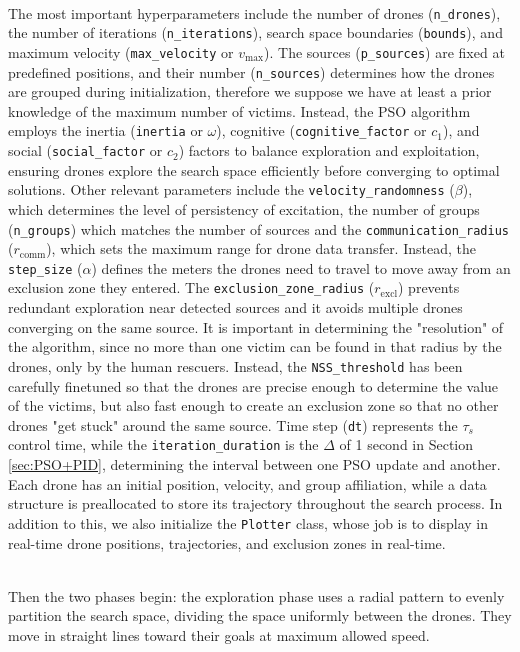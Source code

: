\documentclass[main]{subfiles}
\begin{document}
\noindent\\
The most important hyperparameters 
include the number of drones (\texttt{n\_drones}), 
the number of iterations (\texttt{n\_iterations}), 
search space boundaries (\texttt{bounds}), 
and maximum velocity (\texttt{max\_velocity} or $v_\text{max}$). 
The sources (\texttt{p\_sources}) are fixed at predefined positions, 
and their number (\texttt{n\_sources}) determines how the drones are grouped 
during initialization, therefore 
we suppose we have at least a prior knowledge 
of the maximum number of victims. Instead, the PSO algorithm employs 
the inertia (\texttt{inertia} or $\omega$), cognitive (\texttt{cognitive\_factor} or $c_1$), 
and social (\texttt{social\_factor} or $c_2$) factors to 
balance exploration and exploitation, 
ensuring drones explore the search space efficiently
before converging to optimal solutions.
Other relevant parameters include the \texttt{velocity\_randomness} ($\beta$), 
which determines the level of persistency of excitation, the number of groups 
(\texttt{n\_groups}) which matches the number of sources and
the \texttt{communication\_radius} ($r_\text{comm}$), which sets the maximum range for drone 
data transfer.
Instead, the \texttt{step\_size} ($\alpha$) defines the meters the drones need to 
travel to move away from an exclusion zone they entered. 
The \texttt{exclusion\_zone\_radius} ($r_\text{excl}$) prevents redundant 
exploration near detected sources and it avoids multiple drones 
converging on the same source. It is important in determining
the "resolution" of the algorithm, since no more than one victim can be found in that
radius by the drones, only by the human rescuers.
Instead, the  \texttt{NSS\_threshold} has been carefully finetuned
so that the drones are precise enough to determine the value of the victims,
but also fast enough to create an exclusion zone so that no other drones
"get stuck" around the same source.
Time step (\texttt{dt}) represents 
the $\tau_s$ control time, while the \texttt{iteration\_duration} 
is the $\Delta$ of 1 second in Section \ref{sec:PSO+PID}, determining the interval between one PSO 
update and another.
Each drone has an initial position, velocity, and group affiliation, 
while a data structure is preallocated to store its trajectory 
throughout the search process.
In addition to this, we also initialize the \texttt{Plotter} class, 
whose job is to display in real-time drone positions, trajectories, 
and exclusion zones in real-time.

\noindent\\
Then the two phases begin:
the exploration phase uses a radial pattern to evenly partition 
the search space, dividing the space uniformly 
between the drones. 
They move in straight lines toward their goals at maximum 
allowed speed. 
\end{document}

